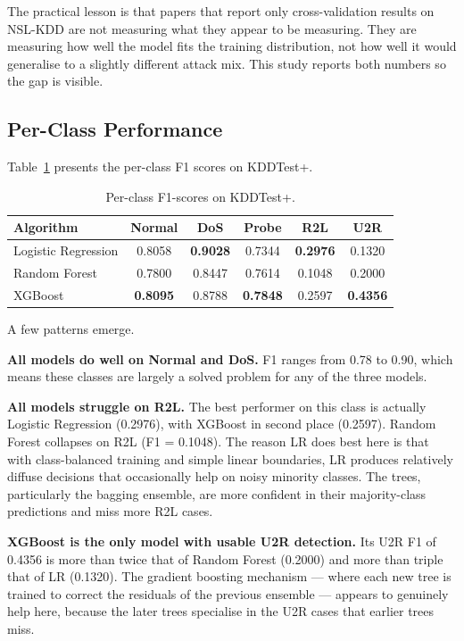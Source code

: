 \documentclass[11pt, a4paper]{article}
\begin{document}
The practical lesson is that papers that report only cross-validation results on NSL-KDD are not measuring what they appear to be measuring. They are measuring how well the model fits the training distribution, not how well it would generalise to a slightly different attack mix. This study reports both numbers so the gap is visible.

\subsection{Per-Class Performance}
Table~\ref{tab:perclass} presents the per-class F1 scores on KDDTest+.

\begin{table}[H]
\centering
\caption{Per-class F1-scores on KDDTest+.}
\label{tab:perclass}
\begin{tabular}{lccccc}
\toprule
Algorithm & Normal & DoS & Probe & R2L & U2R \\
\midrule
Logistic Regression & 0.8058 & \textbf{0.9028} & 0.7344 & \textbf{0.2976} & 0.1320 \\
Random Forest       & 0.7800 & 0.8447 & 0.7614 & 0.1048 & 0.2000 \\
XGBoost             & \textbf{0.8095} & 0.8788 & \textbf{0.7848} & 0.2597 & \textbf{0.4356} \\
\bottomrule
\end{tabular}
\end{table}

A few patterns emerge.

\textbf{All models do well on Normal and DoS.} F1 ranges from 0.78 to 0.90, which means these classes are largely a solved problem for any of the three models.

\textbf{All models struggle on R2L.} The best performer on this class is actually Logistic Regression (0.2976), with XGBoost in second place (0.2597). Random Forest collapses on R2L (F1 = 0.1048). The reason LR does best here is that with class-balanced training and simple linear boundaries, LR produces relatively diffuse decisions that occasionally help on noisy minority classes. The trees, particularly the bagging ensemble, are more confident in their majority-class predictions and miss more R2L cases.

\textbf{XGBoost is the only model with usable U2R detection.} Its U2R F1 of 0.4356 is more than twice that of Random Forest (0.2000) and more than triple that of LR (0.1320). The gradient boosting mechanism --- where each new tree is trained to correct the residuals of the previous ensemble --- appears to genuinely help here, because the later trees specialise in the U2R cases that earlier trees miss.
\end{document}
